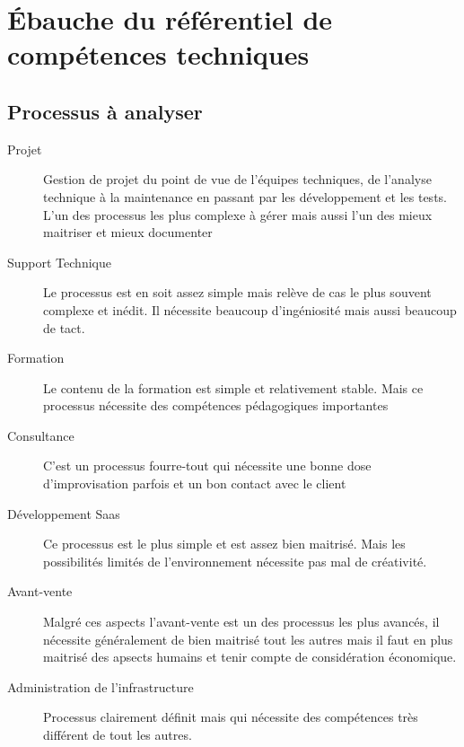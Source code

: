 \chapter{Ébauche du référentiel de compétences techniques}

\section{Processus à analyser}
\begin{description}
  \item[Projet]
  Gestion de projet du point de vue de l'équipes techniques, de l'analyse technique à la maintenance en passant par les développement et les tests. L'un des processus les plus complexe à gérer mais aussi l'un des mieux maitriser et mieux documenter
  \item[Support Technique]
  Le processus est en soit assez simple mais relève de cas le plus souvent complexe et inédit. Il nécessite beaucoup d'ingéniosité mais aussi beaucoup de tact.
  \item[Formation]
  Le contenu de la formation est simple et relativement stable. Mais ce processus nécessite des compétences pédagogiques importantes
  \item[Consultance]
  C'est un processus fourre-tout qui nécessite une bonne dose d'improvisation parfois et un bon contact avec le client
  \item[Développement Saas] 
  Ce processus est le plus simple et est assez bien maitrisé. Mais les possibilités limités de l'environnement nécessite pas mal de créativité.
  \item[Avant-vente]
  Malgré ces aspects l'avant-vente est un des processus les plus avancés, il nécessite généralement de bien maitrisé tout les autres mais il faut en plus maitrisé des apsects humains et tenir compte de considération économique.
  \item[Administration de l'infrastructure]
  Processus clairement définit mais qui nécessite des compétences très différent de tout les autres. 
\end{description}


